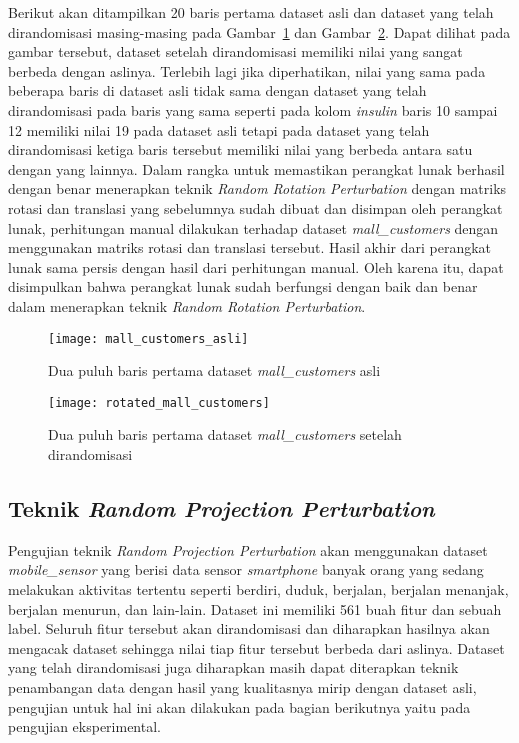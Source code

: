 Berikut akan ditampilkan 20 baris pertama dataset asli dan dataset yang telah dirandomisasi masing-masing pada Gambar~\ref{fig:mall_customers_asli} dan Gambar~\ref{fig:rotated_mall_customers}. Dapat dilihat pada gambar tersebut, dataset setelah dirandomisasi memiliki nilai yang sangat berbeda dengan aslinya. Terlebih lagi jika diperhatikan, nilai yang sama pada beberapa baris di dataset asli tidak sama dengan dataset yang telah dirandomisasi pada baris yang sama seperti pada kolom \textit{insulin} baris 10 sampai 12 memiliki nilai 19 pada dataset asli tetapi pada dataset yang telah dirandomisasi ketiga baris tersebut memiliki nilai yang berbeda antara satu dengan yang lainnya. Dalam rangka untuk memastikan perangkat lunak berhasil dengan benar menerapkan teknik \textit{Random Rotation Perturbation} dengan matriks rotasi dan translasi yang sebelumnya sudah dibuat dan disimpan oleh perangkat lunak, perhitungan manual dilakukan terhadap dataset \textit{mall\_customers} dengan menggunakan matriks rotasi dan translasi tersebut. Hasil akhir dari perangkat lunak sama persis dengan hasil dari perhitungan manual. Oleh karena itu, dapat disimpulkan bahwa perangkat lunak sudah berfungsi dengan baik dan benar dalam menerapkan teknik \textit{Random Rotation Perturbation}.

\begin{figure}
	\centering
	\texttt{[image: mall\_customers\_asli]}
	\caption{Dua puluh baris pertama dataset \textit{mall\_customers} asli}
	\label{fig:mall_customers_asli}
\end{figure}

\begin{figure}
	\centering
	\texttt{[image: rotated\_mall\_customers]}
	\caption{Dua puluh baris pertama dataset \textit{mall\_customers} setelah dirandomisasi}
	\label{fig:rotated_mall_customers}
\end{figure}

\subsection{Teknik \textit{Random Projection Perturbation}}
\label{sec:rpp-fungsional}

Pengujian teknik \textit{Random Projection Perturbation} akan menggunakan dataset \textit{mobile\_sensor} yang berisi data sensor \textit{smartphone} banyak orang yang sedang melakukan aktivitas tertentu seperti berdiri, duduk, berjalan, berjalan menanjak, berjalan menurun, dan lain-lain. Dataset ini memiliki 561 buah fitur dan sebuah label. Seluruh fitur tersebut akan dirandomisasi dan diharapkan hasilnya akan mengacak dataset sehingga nilai tiap fitur tersebut berbeda dari aslinya. Dataset yang telah dirandomisasi juga diharapkan masih dapat diterapkan teknik penambangan data dengan hasil yang kualitasnya mirip dengan dataset asli, pengujian untuk hal ini akan dilakukan pada bagian berikutnya yaitu pada pengujian eksperimental.

